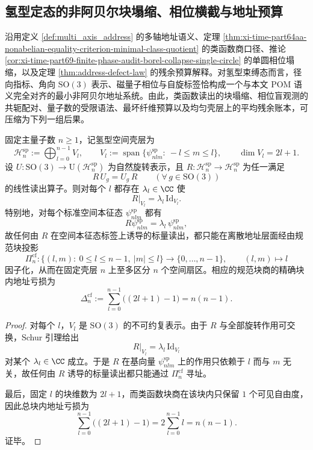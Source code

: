 \subsection{氢型定态的非阿贝尔块塌缩、相位横截与地址预算}\label{subsec:conclusion-hydrogenic-nonabelian-phase-spin-audit}
沿用定义 \ref{def:multi_axis_address} 的多轴地址语义、定理 \ref{thm:xi-time-part64aa-nonabelian-equality-criterion-minimal-class-quotient} 的类函数商口径、推论 \ref{cor:xi-time-part69-finite-phase-audit-borel-collapse-single-circle} 的单圆相位塌缩，以及定理 \ref{thm:address-defect-law} 的残余预算解释。对氢型束缚态而言，径向指标、角向 \(\mathrm{SO}(3)\) 表示、磁量子相位与自旋标签恰构成一个与本文 POM 语义完全对齐的最小非阿贝尔地址系统。由此，类函数读出的块塌缩、相位盲观测的共轭配对、量子数的受限语法、最坏纤维预算以及均匀壳层上的平均残余账本，可压缩为下列一组后果。

\begin{theorem}[氢型角向类函数读出的块坍缩]\label{thm:conclusion-hydrogenic-classfunction-block-collapse}
固定主量子数 \(n\ge 1\)，记氢型空间壳层为
\[
\mathcal H_n^{\mathrm{sp}}
:=
\bigoplus_{l=0}^{n-1}V_l,
\qquad
V_l:=\operatorname{span}\{\psi_{nlm}^{\mathrm{sp}}:\ -l\le m\le l\},
\qquad
\dim V_l=2l+1.
\]
设 \(U:\mathrm{SO}(3)\to \mathrm{U}(\mathcal H_n^{\mathrm{sp}})\) 为自然旋转表示，且 \(R:\mathcal H_n^{\mathrm{sp}}\to \mathcal H_n^{\mathrm{sp}}\) 为任一满足
\[
R\,U_g=U_g\,R
\qquad
(\forall\,g\in \mathrm{SO}(3))
\]
的线性读出算子。则对每个 \(l\) 都存在 \(\lambda_l\in\CC\) 使
\[
R|_{V_l}=\lambda_l\,\mathrm{Id}_{V_l}.
\]
特别地，对每个标准空间本征态 \(\psi_{nlm}^{\mathrm{sp}}\) 都有
\[
R\psi_{nlm}^{\mathrm{sp}}=\lambda_l\,\psi_{nlm}^{\mathrm{sp}},
\]
故任何由 \(R\) 在空间本征态标签上诱导的标量读出，都只能在离散地址层面经由规范块投影
\[
\Pi_n^{\mathrm{cf}}:\{(l,m):\ 0\le l\le n-1,\ |m|\le l\}\longrightarrow \{0,\dots,n-1\},
\qquad
(l,m)\longmapsto l
\]
因子化，从而在固定壳层 \(n\) 上至多区分 \(n\) 个空间扇区。相应的规范块商的精确块内地址亏损为
\[
\Delta_n^{\mathrm{cf}}
:=
\sum_{l=0}^{n-1}\bigl((2l+1)-1\bigr)
=
n(n-1).
\]
\end{theorem}
\begin{proof}
对每个 \(l\)，\(V_l\) 是 \(\mathrm{SO}(3)\) 的不可约复表示。由于 \(R\) 与全部旋转作用可交换，Schur 引理给出
\[
R|_{V_l}=\lambda_l\,\mathrm{Id}_{V_l}
\]
对某个 \(\lambda_l\in\CC\) 成立。于是 \(R\) 在基向量 \(\psi_{nlm}^{\mathrm{sp}}\) 上的作用只依赖于 \(l\) 而与 \(m\) 无关，故任何由 \(R\) 诱导的标量读出都只能通过 \(\Pi_n^{\mathrm{cf}}\) 寻址。

最后，固定 \(l\) 的块维数为 \(2l+1\)，而类函数块商在该块内只保留 \(1\) 个可见自由度，因此总块内地址亏损为
\[
\sum_{l=0}^{n-1}\bigl((2l+1)-1\bigr)
=
2\sum_{l=0}^{n-1}l
=
n(n-1).
\]
证毕。
\end{proof}


